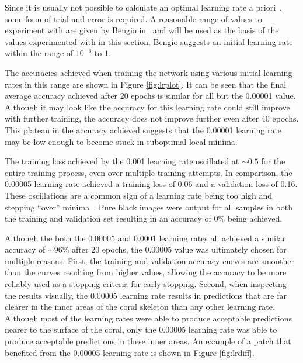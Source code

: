 Since it is usually not possible to calculate an optimal learning rate a priori~\cite{neuralbook}, some form of trial and error is required. A reasonable range of values to experiment with are given by Bengio in~\cite{bengio2012practical} and will be used as the basis of the values experimented with in this section. Bengio suggests an initial learning rate within the range of $10^{-6}$ to $1$.

The accuracies achieved when training the network using various initial learning rates in this range are shown in Figure \ref{fig:lrplot}. It can be seen that the final average accuracy achieved after 20 epochs is similar for all but the 0.00001 value. Although it may look like the accuracy for this learning rate could still improve with further training, the accuracy does not improve further even after 40 epochs. This plateau in the accuracy achieved suggests that the 0.00001 learning rate may be low enough to become stuck in suboptimal local minima.

The training loss achieved by the 0.001 learning rate oscillated at ${\sim}0.5$ for the entire training process, even over multiple training attempts. In comparison, the 0.00005 learning rate achieved a training loss of 0.06 and a validation loss of 0.16. These oscillations are a common sign of a learning rate being too high and stepping ``over'' minima~\cite{bishop1995neural}. Pure black images were output for all samples in both the training and validation set resulting in an accuracy of 0\% being achieved.

Although the both the 0.00005 and 0.0001 learning rates all achieved a similar accuracy of ${\sim}96\%$ after 20 epochs, the 0.00005 value was ultimately chosen for multiple reasons. First, the training and validation accuracy curves are smoother than the curves resulting from higher values, allowing the accuracy to be more reliably used as a stopping criteria for early stopping. Second, when inspecting the results visually, the 0.00005 learning rate results in predictions that are far clearer in the inner areas of the coral skeleton than any other learning rate. Although most of the learning rates were able to produce acceptable predictions nearer to the surface of the coral, only the 0.00005 learning rate was able to produce acceptable predictions in these inner areas. An example of a patch that benefited from the 0.00005 learning rate is shown in Figure \ref{fig:lrdiff}.

